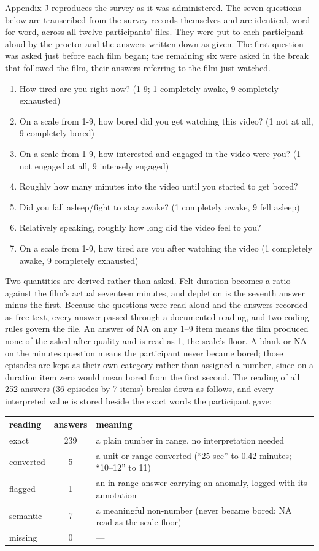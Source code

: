 Appendix J reproduces the survey as it was administered. The seven questions below are
transcribed from the survey records themselves and are identical, word for word, across all
twelve participants' files. They were put to each participant aloud by the proctor and the
answers written down as given. The first question was asked just before each film began; the
remaining six were asked in the break that followed the film, their answers referring to the
film just watched.

\begin{enumerate}
\item How tired are you right now? (1-9; 1 completely awake, 9 completely exhausted)
\item On a scale from 1-9, how bored did you get watching this video? (1 not at all, 9
completely bored)
\item On a scale from 1-9, how interested and engaged in the video were you? (1 not engaged
at all, 9 intensely engaged)
\item Roughly how many minutes into the video until you started to get bored?
\item Did you fall asleep/fight to stay awake? (1 completely awake, 9 fell asleep)
\item Relatively speaking, roughly how long did the video feel to you?
\item On a scale from 1-9, how tired are you after watching the video (1 completely awake, 9
completely exhausted)
\end{enumerate}

Two quantities are derived rather than asked. Felt duration becomes a ratio against the
film's actual seventeen minutes, and depletion is the seventh answer minus the first. Because
the questions were read aloud and the answers recorded as free text, every answer passed
through a documented reading, and two coding rules govern the file. An answer of NA on any
1--9 item means the film produced none of the asked-after quality and is read as 1, the
scale's floor. A blank or NA on the minutes question means the participant never became
bored; those episodes are kept as their own category rather than assigned a number, since on
a duration item zero would mean bored from the first second. The reading of all 252 answers
(36 episodes by 7 items) breaks down as follows, and every interpreted value is stored
beside the exact words the participant gave:

\begin{tabular}{lcl}
\hline
reading & answers & meaning \\
\hline
exact & 239 & a plain number in range, no interpretation needed \\
converted & 5 & a unit or range converted (``25 sec'' to 0.42 minutes; ``10--12'' to 11) \\
flagged & 1 & an in-range answer carrying an anomaly, logged with its annotation \\
semantic & 7 & a meaningful non-number (never became bored; NA read as the scale floor) \\
missing & 0 & --- \\
\hline
\end{tabular}

